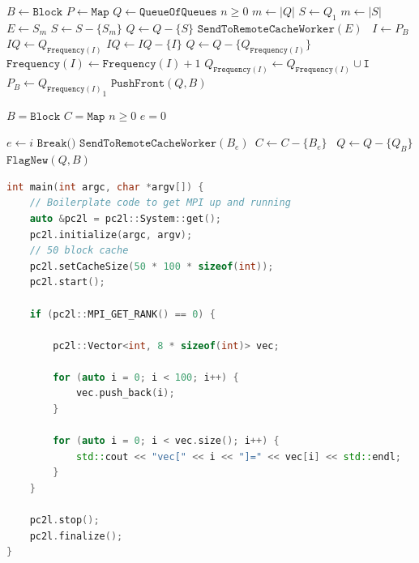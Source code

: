 \begin{algorithm}
	\caption{Least Frequently Used Block Access}
	\label{alg:lfu}
	\begin{algorithmic}[1]
		\State $B \gets \texttt{Block}$
		\State $P \gets \texttt{Map}$
		\State $Q \gets \texttt{QueueOfQueues}$ 
		\State $n \ge 0$
		\State $m \gets |Q|$
		\State $S \gets Q_1$
		\State $m \gets |S|$
		\State $E \gets S_m$
		\State $S \gets S - \{S_m\}$
		\State $Q \gets Q - \{S\}$
		\EndIf
		\State $\texttt{SendToRemoteCacheWorker}(E)$\
		\EndIf
		\Else
		\State $I \gets P_B$
		\State $IQ \gets Q_{\texttt{Frequency}(I)}$
		\State $IQ \gets IQ - \{I\}$
		\State $Q \gets Q - \{Q_{\texttt{Frequency}(I)}\}$
		\EndIf
		\State $\texttt{Frequency}(I) \gets \texttt{Frequency}(I) + 1$
		\State $Q_{\texttt{Frequency}(I)} \gets Q_{\texttt{Frequency}(I)} \cup \texttt{I}$
		\State $P_B \gets {Q_{\texttt{Frequency}(I)}}_1$
		\EndIf
		\State $\texttt{PushFront}(Q, B)$
	\end{algorithmic}
\end{algorithm}

\begin{algorithm}
	\caption{Pseudo Least Recently Block Access}
	\label{alg:plru}
	\begin{algorithmic}[1]
		\State $B = \texttt{Block}$
		\State $C = \texttt{Map}$
		\State $n \ge 0$
		\State $e = 0$
		\EndIf
		
		\State $e \gets i$
		\State $\texttt{Break()}$
		\EndIf
		\State $\texttt{SendToRemoteCacheWorker}(B_{e})$\
		\State $C \gets C - \{B_{e}\}$\
		\EndFor
		\Else
		\State $Q \gets Q - \{Q_B\}$
		\EndIf
		\State $\texttt{FlagNew}(Q, B)$
	\end{algorithmic}
\end{algorithm}


\begin{lstlisting}[language=C++, caption=PC2L minimal example, label=lst:minimal, captionpos=b, float]
int main(int argc, char *argv[]) {
	// Boilerplate code to get MPI up and running
	auto &pc2l = pc2l::System::get();
	pc2l.initialize(argc, argv);
	// 50 block cache
	pc2l.setCacheSize(50 * 100 * sizeof(int));
	pc2l.start();
	
	if (pc2l::MPI_GET_RANK() == 0) {
		
		pc2l::Vector<int, 8 * sizeof(int)> vec;
		
		for (auto i = 0; i < 100; i++) {
			vec.push_back(i);
		}
		
		for (auto i = 0; i < vec.size(); i++) {
			std::cout << "vec[" << i << "]=" << vec[i] << std::endl;
		}
	}
	
	pc2l.stop();
	pc2l.finalize();
}
\end{lstlisting}


